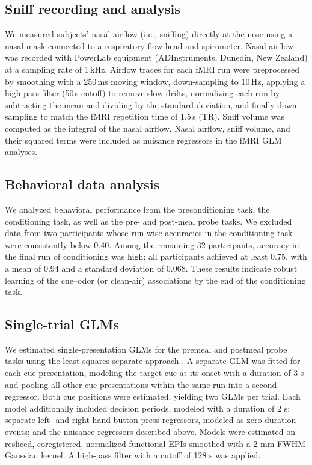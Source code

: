 \documentclass[12pt,letterpaper]{article}
\begin{document}
\subsection*{Sniff recording and analysis}

We measured subjects’ nasal airflow (i.e., sniffing) directly at the nose using a nasal mask connected to a respiratory flow head and spirometer. Nasal airflow was recorded with PowerLab equipment (ADInstruments, Dunedin, New Zealand) at a sampling rate of 1\,kHz. Airflow traces for each fMRI run were preprocessed by smoothing with a 250\,ms moving window, down-sampling to 10\,Hz, applying a high-pass filter (50\,s cutoff) to remove slow drifts, normalizing each run by subtracting the mean and dividing by the standard deviation, and finally down-sampling to match the fMRI repetition time of 1.5\,s (TR). Sniff volume was computed as the integral of the nasal airflow. Nasal airflow, sniff volume, and their squared terms were included as nuisance regressors in the fMRI GLM analyses.


\subsection*{Behavioral data analysis}

We analyzed behavioral performance from the preconditioning task, the conditioning task, as well as the pre- and post-meal probe tasks. We excluded data from two participants whose run-wise accuracies in the conditioning task were consistently below 0.40. Among the remaining 32 participants, accuracy in the final run of conditioning was high: all participants achieved at least 0.75, with a mean of 0.94 and a standard deviation of 0.068. These results indicate robust learning of the cue–odor (or clean-air) associations by the end of the conditioning task. 



\subsection*{Single-trial GLMs}


We estimated single-presentation GLMs for the premeal and postmeal probe tasks using the least-squares-separate approach \cite{mumford2012deconvolving}. A separate GLM was fitted for each cue presentation, modeling the target cue at its onset with a duration of 3 s and pooling all other cue presentations within the same run into a second regressor. Both cue positions were estimated, yielding two GLMs per trial. Each model additionally included decision periods, modeled with a duration of 2 s; separate left- and right-hand button-press regressors, modeled as zero-duration events; and the nuisance regressors described above. Models were estimated on resliced, coregistered, normalized functional EPIs smoothed with a 2 mm FWHM Gaussian kernel. A high-pass filter with a cutoff of 128 s was applied.
\end{document}
